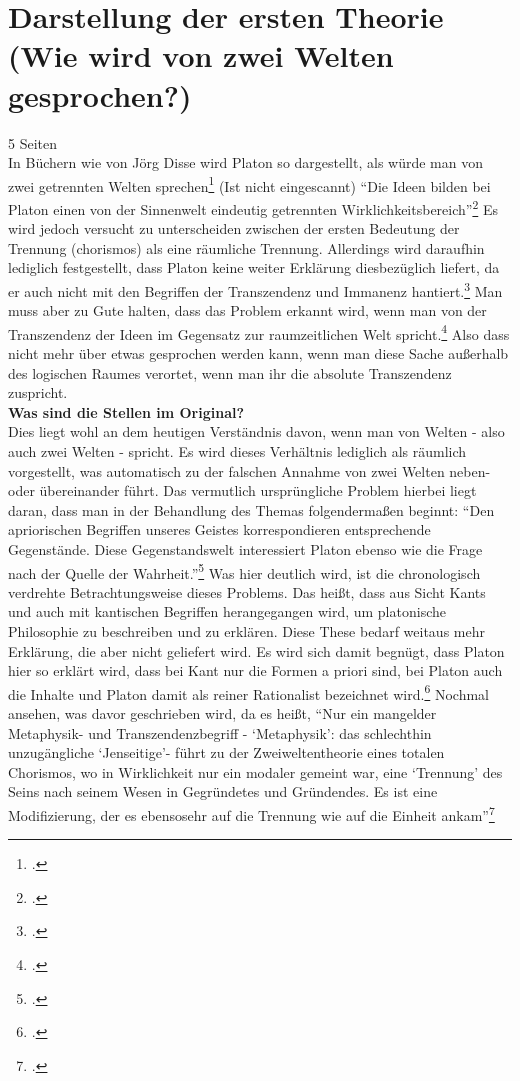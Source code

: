 \documentclass[12pt]{article}
\begin{document}
\section{Darstellung der ersten Theorie (Wie wird von zwei Welten gesprochen?)}
5 Seiten\\
In Büchern wie von Jörg Disse wird Platon so dargestellt, als würde man von zwei getrennten Welten sprechen\footcite[vgl.][S. 22 und 28]{DisseMetaphysik} (Ist nicht eingescannt)
\enquote{Die Ideen bilden bei Platon einen von der Sinnenwelt eindeutig getrennten Wirklichkeitsbereich}\footcite[][S. 31]{DisseMetaphysik}
Es wird jedoch versucht zu unterscheiden zwischen der ersten Bedeutung der Trennung (chorismos) als eine räumliche Trennung. Allerdings wird daraufhin lediglich festgestellt, dass Platon keine weiter Erklärung diesbezüglich liefert, da er auch nicht mit den Begriffen der Transzendenz und Immanenz hantiert.\footcite[vgl.][S. 34f]{DisseMetaphysik} Man muss aber zu Gute halten, dass das Problem erkannt wird, wenn man von der Transzendenz der Ideen im Gegensatz zur raumzeitlichen Welt spricht.\footcite[vgl.][S. 35]{DisseMetaphysik} Also dass nicht mehr über etwas gesprochen werden kann, wenn man diese Sache außerhalb des logischen Raumes verortet, wenn man ihr die absolute Transzendenz zuspricht.\\
\textbf{Was sind die Stellen im Original?}\\
Dies liegt wohl an dem heutigen Verständnis davon, wenn man von Welten - also auch zwei Welten - spricht. Es wird dieses Verhältnis lediglich als räumlich vorgestellt, was automatisch zu der falschen Annahme von zwei Welten neben- oder übereinander führt.
Das vermutlich ursprüngliche Problem hierbei liegt daran, dass man in der Behandlung des Themas folgendermaßen beginnt: \enquote{Den apriorischen Begriffen unseres Geistes korrespondieren entsprechende Gegenstände. Diese Gegenstandswelt interessiert Platon ebenso wie die Frage nach der Quelle der Wahrheit.}\footcite[][S. 97]{Hirschberger}
Was hier deutlich wird, ist die chronologisch verdrehte Betrachtungsweise dieses Problems. Das heißt, dass aus Sicht Kants und auch mit kantischen Begriffen herangegangen wird, um platonische Philosophie zu beschreiben und zu erklären. Diese These bedarf weitaus mehr Erklärung, die aber nicht geliefert wird. Es wird sich damit begnügt, dass Platon hier so erklärt wird, dass bei Kant nur die Formen a priori sind, bei Platon auch die Inhalte und Platon damit als reiner Rationalist bezeichnet wird.\footcite[vgl.][S.96]{Hirschberger} 
Nochmal ansehen, was davor geschrieben wird, da es heißt, \enquote{Nur ein mangelder Metaphysik- und Transzendenzbegriff - \enquote{Metaphysik}: das schlechthin unzugängliche \enquote{Jenseitige}- führt zu der Zweiweltentheorie eines totalen Chorismos, wo in Wirklichkeit nur ein modaler gemeint war, eine \enquote{Trennung} des Seins nach seinem Wesen in Gegründetes und Gründendes. Es ist eine Modifizierung, der es ebensosehr auf die Trennung wie auf die Einheit ankam}\footcite[][S. 96]{Hirschberger}
\end{document}
